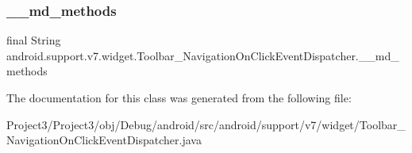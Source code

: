 \subsubsection{\texorpdfstring{\+\_\+\+\_\+md\+\_\+methods}{\_\_md\_methods}}
{\footnotesize\ttfamily final String android.\+support.\+v7.\+widget.\+Toolbar\+\_\+\+Navigation\+On\+Click\+Event\+Dispatcher.\+\_\+\+\_\+md\+\_\+methods\hspace{0.3cm}{\ttfamily [static]}}



The documentation for this class was generated from the following file\+:\begin{DoxyCompactItemize}
\item 
Project3/\+Project3/obj/\+Debug/android/src/android/support/v7/widget/Toolbar\+\_\+\+Navigation\+On\+Click\+Event\+Dispatcher.\+java\end{DoxyCompactItemize}
